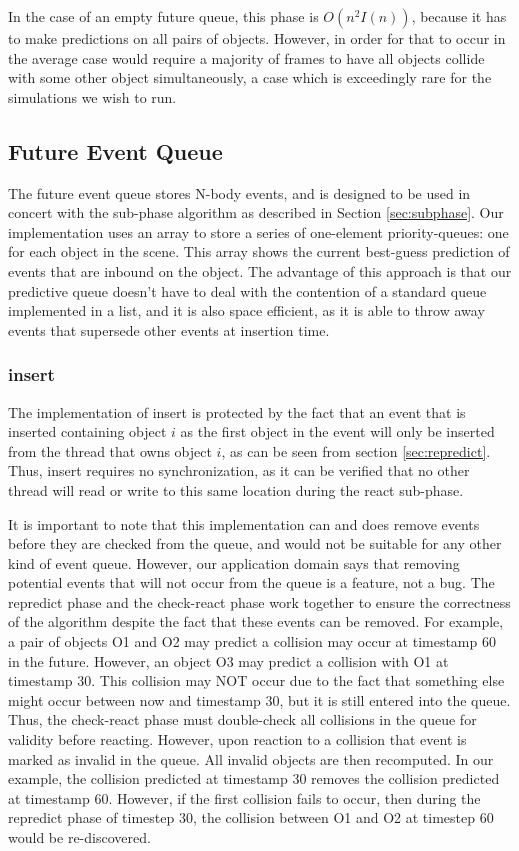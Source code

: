 \documentclass[conference]{IEEEtran}
\begin{document}
In the case of an empty future queue, this phase is $O(n^2 I(n))$, because it has to make predictions on all pairs of objects.  However, in order for that to occur in the average case would require a majority of frames to have all objects collide
with some other object simultaneously, a case which is exceedingly rare for the simulations we wish to run.

\subsection{Future Event Queue}
\label{feq}
The future event queue stores N-body events, and is designed to be used in concert with the sub-phase algorithm as described in Section \ref{sec:subphase}.
Our implementation uses an array to store a series of one-element priority-queues: one for each object in the scene.  This array shows the current best-guess
prediction of events that are inbound on the object.  The advantage of this approach is that our predictive queue doesn't have to deal with the contention of 
a standard queue implemented in a list, and it is also space efficient, as it is able to throw away events that supersede other events at insertion time.


\subsubsection{insert}

The implementation of insert is protected by the fact that an event that is inserted containing object $i$ as the first object in the event will only
be inserted from the thread that owns object $i$, as can be seen from section \ref{sec:repredict}.  Thus, insert requires no synchronization, as it can be verified
that no other thread will read or write to this same location during the react sub-phase.  

It is important to note that this implementation can and does remove events before they are checked from the queue,
and would not be suitable for any other kind of event queue.  However, our application domain says that removing potential events that will not occur from the queue is a feature, not a bug.
The repredict phase and the check-react phase work together to ensure the correctness of the algorithm despite the fact that these events can be removed.
For example, a pair of objects O1 and O2 may predict a collision may occur at timestamp 60 in the future.  However, an object O3 may predict a collision with O1 at timestamp 30.
This collision may NOT occur due to the fact that something else might occur between now and timestamp 30, but it is still entered into the queue.  Thus, the check-react phase must double-check
all collisions in the queue for validity before reacting.  However, upon reaction to a collision that event is marked as invalid in the queue.  All invalid
objects are then recomputed.  In our example, the collision predicted at timestamp 30 removes the collision predicted at timestamp 60.  However,
if the first collision fails to occur, then during the repredict phase of timestep 30, the collision between O1 and O2 at timestep 60 would be re-discovered.
\end{document}
